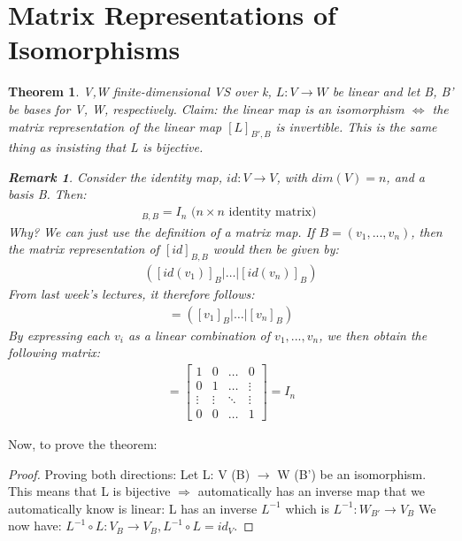 \documentclass[a4paper, 12pt]{article}
\newtheorem{theorem}{Theorem}
\theoremstyle{definition}
\theoremstyle{definition}
\theoremstyle{definition}
\theoremstyle{definition}
\newtheorem{rmk}{Remark}[section]
\begin{document}
{\section{Matrix Representations of Isomorphisms}
\begin{theorem}
	V,W finite-dimensional VS over k, $L:V \rightarrow W$ be linear and let B, B' be bases for V, W, respectively. Claim: the linear map is an isomorphism $\iff$ the matrix representation of the linear map $[L]_{B',B}$ is invertible. This is  the same thing as insisting that L is bijective. 
\begin{rmk}
	Consider the identity map, $id: V \rightarrow V$, with $dim(V) = n$, and a basis B. Then: 
	\begin{align*}
		[id]_{B,B} = I_n \mbox{ ($n \times n$ identity matrix) } 
	\end{align*}
	Why? We can just use the definition of a matrix map. 
	\newline
	\newline
	If $B = (v_1, ..., v_n)$, then the matrix representation of $[id]_{B,B}$ would then be given by: 
	\begin{align*}
		([id(v_1)]_B|\hdots | [id(v_n)]_B)
	\end{align*}
	From last week's lectures, it therefore follows: 
	\begin{align*}
			=	([v_1]_B|\hdots | [v_n]_B)
	\end{align*}
	By expressing each $v_i$ as a linear combination of $v_1,..., v_n$, we then obtain the following matrix:
	\begin{align*}
		= \begin{bmatrix}
			1 & 0 & \hdots & 0 \\
			0 & 1 & \hdots & \vdots \\
			\vdots & \vdots & \ddots & \vdots \\
			0 & 0 & \hdots & 1
		\end{bmatrix}
		= I_n 
	\end{align*}
\end{rmk}
\end{theorem}
Now, to prove the theorem: 
\begin{proof} Proving both directions: \newline
[ $\Rightarrow$ ] Let L: V (B) $\rightarrow$ W (B') be an isomorphism. This means that L is bijective $\Rightarrow$ automatically has an inverse map that we automatically know is linear: L has an inverse $L^{-1}$ which is $L^{-1} : W_{B'} \rightarrow V_{B}$ We now have: $L^{-1} \circ L: V_B \rightarrow V_B, L^{-1} \circ L = id_V$. 

\end{proof}}
\end{document}

